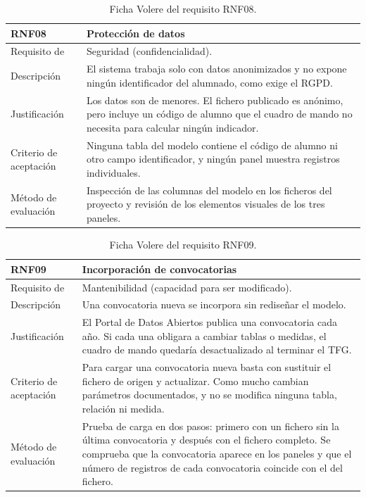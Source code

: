 \documentclass[12pt, a4paper, oneside]{report}
\begin{document}
\begin{table}[!htbp]
\centering
\small
{}\renewcommand{\arraystretch}{1.0}\setlength{\defaultaddspace}{3pt}
\begin{tabularx}{\textwidth}{@{} >{\raggedright\arraybackslash}p{3.4cm} X @{}}
\toprule
\textbf{RNF08} & \textbf{Protección de datos} \\ \midrule
Requisito de & Seguridad (confidencialidad). \\ \addlinespace
Descripción & El sistema trabaja solo con datos anonimizados y no expone ningún identificador del alumnado, como exige el RGPD. \\ \addlinespace
Justificación & Los datos son de menores. El fichero publicado es anónimo, pero incluye un código de alumno que el cuadro de mando no necesita para calcular ningún indicador. \\ \addlinespace
Criterio de aceptación & Ninguna tabla del modelo contiene el código de alumno ni otro campo identificador, y ningún panel muestra registros individuales. \\ \addlinespace
Método de evaluación & Inspección de las columnas del modelo en los ficheros del proyecto y revisión de los elementos visuales de los tres paneles. \\ \bottomrule
\end{tabularx}
\caption{Ficha Volere del requisito RNF08.}
\label{tab:rnf08}
\end{table}

\begin{table}[!htbp]
\centering
\small
{}\renewcommand{\arraystretch}{1.0}\setlength{\defaultaddspace}{3pt}
\begin{tabularx}{\textwidth}{@{} >{\raggedright\arraybackslash}p{3.4cm} X @{}}
\toprule
\textbf{RNF09} & \textbf{Incorporación de convocatorias} \\ \midrule
Requisito de & Mantenibilidad (capacidad para ser modificado). \\ \addlinespace
Descripción & Una convocatoria nueva se incorpora sin rediseñar el modelo. \\ \addlinespace
Justificación & El Portal de Datos Abiertos publica una convocatoria cada año. Si cada una obligara a cambiar tablas o medidas, el cuadro de mando quedaría desactualizado al terminar el TFG. \\ \addlinespace
Criterio de aceptación & Para cargar una convocatoria nueva basta con sustituir el fichero de origen y actualizar. Como mucho cambian parámetros documentados, y no se modifica ninguna tabla, relación ni medida. \\ \addlinespace
Método de evaluación & Prueba de carga en dos pasos: primero con un fichero sin la última convocatoria y después con el fichero completo. Se comprueba que la convocatoria aparece en los paneles y que el número de registros de cada convocatoria coincide con el del fichero. \\ \bottomrule
\end{tabularx}
\caption{Ficha Volere del requisito RNF09.}
\label{tab:rnf09}
\end{table}
\end{document}
